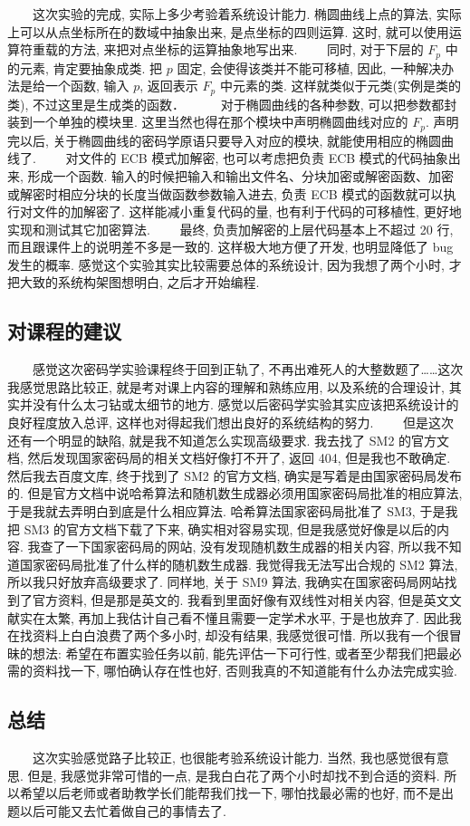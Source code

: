 \documentclass[12pt,a4paper]{article}
\begin{document}
　　这次实验的完成, 实际上多少考验着系统设计能力. 椭圆曲线上点的算法, 实际上可以从点坐标所在的数域中抽象出来, 是点坐标的四则运算. 这时, 就可以使用运算符重载的方法, 来把对点坐标的运算抽象地写出来. 
\newline
　　同时, 对于下层的 $ F_p $ 中的元素, 肯定要抽象成类. 把 $ p $ 固定, 会使得该类并不能可移植, 因此, 一种解决办法是给一个函数, 输入 $ p $, 返回表示 $ F_p $ 中元素的类. 这样就类似于元类(实例是类的类), 不过这里是生成类的函数．　
\newline
　　对于椭圆曲线的各种参数, 可以把参数都封装到一个单独的模块里. 这里当然也得在那个模块中声明椭圆曲线对应的 $ F_p $. 声明完以后, 关于椭圆曲线的密码学原语只要导入对应的模块, 就能使用相应的椭圆曲线了. 
\newline
　　对文件的 ECB 模式加解密, 也可以考虑把负责 ECB 模式的代码抽象出来, 形成一个函数. 输入的时候把输入和输出文件名、分块加密或解密函数、加密或解密时相应分块的长度当做函数参数输入进去, 负责 ECB 模式的函数就可以执行对文件的加解密了. 这样能减小重复代码的量, 也有利于代码的可移植性, 更好地实现和测试其它加密算法. 
\newline
　　最终, 负责加解密的上层代码基本上不超过 20 行, 而且跟课件上的说明差不多是一致的. 这样极大地方便了开发, 也明显降低了 bug 发生的概率. 感觉这个实验其实比较需要总体的系统设计, 因为我想了两个小时, 才把大致的系统构架图想明白, 之后才开始编程. 

\subsection*{对课程的建议}

　　感觉这次密码学实验课程终于回到正轨了, 不再出难死人的大整数题了……这次我感觉思路比较正, 就是考对课上内容的理解和熟练应用, 以及系统的合理设计, 其实并没有什么太刁钻或太细节的地方. 感觉以后密码学实验其实应该把系统设计的良好程度放入总评, 这样也对得起我们想出良好的系统结构的努力. 
\newline
　　但是这次还有一个明显的缺陷, 就是我不知道怎么实现高级要求. 我去找了 SM2 的官方文档, 然后发现国家密码局的相关文档好像打不开了, 返回 404, 但是我也不敢确定. 然后我去百度文库, 终于找到了 SM2 的官方文档, 确实是写着是由国家密码局发布的. 但是官方文档中说哈希算法和随机数生成器必须用国家密码局批准的相应算法, 于是我就去弄明白到底是什么相应算法. 哈希算法国家密码局批准了 SM3, 于是我把 SM3 的官方文档下载了下来, 确实相对容易实现, 但是我感觉好像是以后的内容. 我查了一下国家密码局的网站, 没有发现随机数生成器的相关内容, 所以我不知道国家密码局批准了什么样的随机数生成器. 我觉得我无法写出合规的 SM2 算法, 所以我只好放弃高级要求了. 同样地, 关于 SM9 算法, 我确实在国家密码局网站找到了官方资料, 但是那是英文的. 我看到里面好像有双线性对相关内容, 但是英文文献实在太繁, 再加上我估计自己看不懂且需要一定学术水平, 于是也放弃了. 因此我在找资料上白白浪费了两个多小时, 却没有结果, 我感觉很可惜. 所以我有一个很冒昧的想法: 希望在布置实验任务以前, 能先评估一下可行性, 或者至少帮我们把最必需的资料找一下, 哪怕确认存在性也好, 否则我真的不知道能有什么办法完成实验. 

\subsection*{总结}

　　这次实验感觉路子比较正, 也很能考验系统设计能力. 当然, 我也感觉很有意思. 但是, 我感觉非常可惜的一点, 是我白白花了两个小时却找不到合适的资料. 所以希望以后老师或者助教学长们能帮我们找一下, 哪怕找最必需的也好, 而不是出题以后可能又去忙着做自己的事情去了. 
\end{document}
